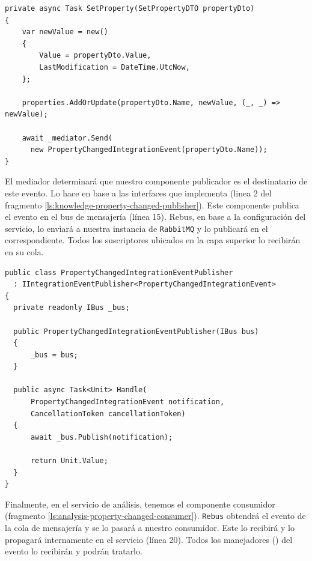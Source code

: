 \begin{lstlisting}[language={[Sharp]C},caption={Implementación del método que asigna valor a una propiedad. Muestra un ejemplo de propagación interna de eventos de integración.},captionpos=b, label=ls:knowledge-set-property]
private async Task SetProperty(SetPropertyDTO propertyDto)
{
    var newValue = new()
    {
        Value = propertyDto.Value,
        LastModification = DateTime.UtcNow,
    };

    properties.AddOrUpdate(propertyDto.Name, newValue, (_, _) => newValue);

    await _mediator.Send(
      new PropertyChangedIntegrationEvent(propertyDto.Name));
}

\end{lstlisting}

El mediador determinará que nuestro componente publicador es el destinatario de este evento. Lo hace en base a las interfaces que implementa (linea 2 del fragmento \ref{ls:knowledge-property-changed-publisher}). Este componente publica el evento en el bus de mensajería (línea 15). Rebus, en base a la configuración del servicio, lo enviará a nuestra instancia de \texttt{RabbitMQ} y lo publicará en el  correspondiente. Todos los suscriptores ubicados en la capa superior lo recibirán en su cola.

\begin{lstlisting}[language={[Sharp]C},caption={El publicador de eventos captura el evento de integración y lo publica en el bus.},captionpos=b, label=ls:knowledge-property-changed-publisher]
public class PropertyChangedIntegrationEventPublisher
  : IIntegrationEventPublisher<PropertyChangedIntegrationEvent>
{
  private readonly IBus _bus;

  public PropertyChangedIntegrationEventPublisher(IBus bus)
  {
      _bus = bus;
  }

  public async Task<Unit> Handle(
      PropertyChangedIntegrationEvent notification,
      CancellationToken cancellationToken)
  {
      await _bus.Publish(notification);

      return Unit.Value;
  }
}
\end{lstlisting}

Finalmente, en el servicio de análisis, tenemos el componente consumidor (fragmento \ref{ls:analysis-property-changed-consumer}). \texttt{Rebus} obtendrá el evento de la cola de mensajería y se lo pasará a nuestro consumidor. Este lo recibirá y lo propagará internamente en el servicio (línea 20). Todos los manejadores () del evento lo recibirán y podrán tratarlo.

